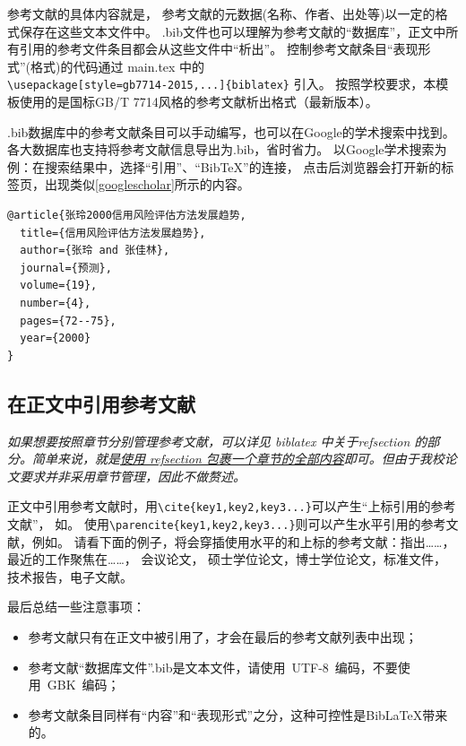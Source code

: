 参考文献的具体内容就是，
参考文献的元数据(名称、作者、出处等)以一定的格式保存在这些文本文件中。
.bib文件也可以理解为参考文献的``数据库''，正文中所有引用的参考文件条目都会从这些文件中``析出''。
控制参考文献条目``表现形式''(格式)的代码通过 main.tex 中的 \\ \verb|\usepackage[style=gb7714-2015,...]{biblatex}| 引入。
按照学校要求，本模板使用的是国标GB/T 7714风格的参考文献析出格式（最新版本）。

.bib数据库中的参考文献条目可以手动编写，也可以在Google的学术搜索中找到。
各大数据库也支持将参考文献信息导出为.bib，省时省力。
以Google学术搜索为例：在搜索结果中，选择``引用''、``BibTeX''的连接，
点击后浏览器会打开新的标签页，出现类似\autoref{googlescholar}所示的内容。

\begin{lstlisting}[caption={从Google Scholar找到的，但并不规范的.bib条目}, label=googlescholar, float, escapeinside="", numbers=none]
@article{张玲2000信用风险评估方法发展趋势,
  title={信用风险评估方法发展趋势},
  author={张玲 and 张佳林},
  journal={预测},
  volume={19},
  number={4},
  pages={72--75},
  year={2000}
}
\end{lstlisting}

\subsection{在正文中引用参考文献}

\textit{如果想要按照章节分别管理参考文献，可以详见 biblatex 中关于refsection 的部分。简单来说，就是\href{https://github.com/BITNP/BIThesis/discussions/435}{使用 refsection 包裹一个章节的全部内容}即可。但由于我校论文要求并非采用章节管理，因此不做赘述。}

正文中引用参考文献时\cite{Jiang2005Size}，用\verb+\cite{key1,key2,key3...}+可以产生“上标引用的参考文献”，
如\cite{Meta_CN,chen2007act,DPMG}。
使用\verb+\parencite{key1,key2,key3...}+则可以产生水平引用的参考文献，例如\parencite{JohnD,zhubajie,IEEE-1363}。
请看下面的例子，将会穿插使用水平的和上标的参考文献：\parencite{Meta_CN,JohnD,IEEE-1363}指出……，最近的工作\cite{chen2007act,chen2007ewi}聚焦在……，
会议论文\cite{DPMG,kocher99,cnproceed}，
硕士学位论文\cite{zhubajie,metamori2004}，博士学位论文\cite{shaheshang,FistSystem01,bai2008}，标准文件\cite{IEEE-1363}，技术报告\cite{NPB2}，电子文献\cite{xiaoyu2001, CHRISTINE1998}。

最后总结一些注意事项：
\begin{itemize}
\item  参考文献只有在正文中被引用了，才会在最后的参考文献列表中出现；
\item  参考文献``数据库文件''.bib是文本文件，请使用~UTF-8~编码，不要使用~GBK~编码；
\item  参考文献条目同样有“内容”和“表现形式”之分，这种可控性是BibLaTeX带来的。
\end{itemize}


